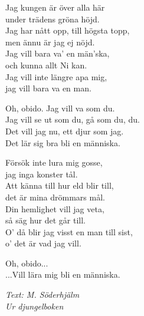 \vspace{10pt}
Jag kungen är över alla här\\
under trädens gröna höjd.\\
Jag har nått opp, till högsta topp,\\
men ännu är jag ej nöjd.\\
Jag vill bara va' en män'ska,\\
och kunna allt Ni kan.\\
Jag vill inte längre apa mig,\\
jag vill bara va en man.\par
\vspace{10pt}
Oh, obido. Jag vill va som du.\\
Jag vill se ut som du, gå som du, du.\\
Det vill jag nu, ett djur som jag.\\
Det lär sig bra bli en människa.\par
\vspace{10pt}
Försök inte lura mig gosse,\\
jag inga konster tål.\\
Att känna till hur eld blir till,\\
det är mina drömmars mål.\\
Din hemlighet vill jag veta,\\
så säg hur det går till.\\
O' då blir jag visst en man till sist,\\
o' det är vad jag vill.\par
\vspace{10pt}
Oh, obido...\\
...Vill lära mig bli en människa.
\par
\vspace{10pt}
{\footnotesize\textit{Text: M. Söderhjälm\\Ur djungelboken}}
